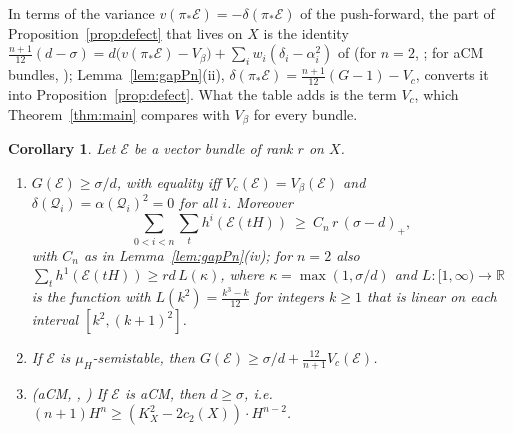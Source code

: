\documentclass[11pt]{amsart}
\newtheorem{corollary}[theorem]{Corollary}
\theoremstyle{definition}
\theoremstyle{remark}
\newcommand{\RR}{\mathbb{R}}
\newcommand{\cE}{\mathcal{E}}
\newcommand{\cQ}{\mathcal{Q}}
\begin{document}
In terms of the variance $v(\pi_*\cE)=-\delta(\pi_*\cE)$ of the push-forward, the part of Proposition~\ref{prop:defect} that lives on $X$ is the identity $\frac{n+1}{12}(d-\sigma)=d\big(v(\pi_*\cE)-V_\beta\big)+\sum_iw_i(\delta_i-\alpha_i^2)$ of \cite[(10.3)]{An3} (for $n=2$, \cite[Prop.~9.1]{An3}; for aCM bundles, \cite[Prop.~2.6]{An2}); Lemma~\ref{lem:gapPn}(ii), $\delta(\pi_*\cE)=\frac{n+1}{12}(G-1)-V_c$, converts it into Proposition~\ref{prop:defect}. What the table adds is the term $V_c$, which Theorem~\ref{thm:main} compares with $V_\beta$ for every bundle.

\begin{corollary}\label{cor:cases}
Let $\cE$ be a vector bundle of rank $r$ on $X$.
\begin{enumerate}[label=\textup{(\alph*)}]
\item $G(\cE)\ge\sigma/d$, with equality iff $V_c(\cE)=V_\beta(\cE)$ and $\delta(\cQ_i)=\alpha(\cQ_i)^2=0$ for all $i$. Moreover
\[
\sum_{0<i<n}\sum_th^i(\cE(tH))\ \ge\ C_n\,r\,(\sigma-d)_+ ,
\]
with $C_n$ as in Lemma~\ref{lem:gapPn}(iv); for $n=2$ also $\sum_th^1(\cE(tH))\ge rd\,L(\kappa)$, where $\kappa=\max(1,\sigma/d)$ and $L\colon[1,\infty)\to\RR$ is the function with $L(k^2)=\frac{k^3-k}{12}$ for integers $k\ge1$ that is linear on each interval $[k^2,(k+1)^2]$.
\item If $\cE$ is $\mu_H$-semistable, then $G(\cE)\ge\sigma/d+\frac{12}{n+1}V_c(\cE)$.
\item \textup{(aCM, \cite[Thm.~1.1, Prop.~5.1]{An2}, \cite[\S10.7]{An3})} If $\cE$ is aCM, then $d\ge\sigma$, i.e.\ $(n+1)H^n\ge(K_X^2-2c_2(X))\cdot H^{n-2}$.
\end{enumerate}
\end{corollary}
\end{document}
